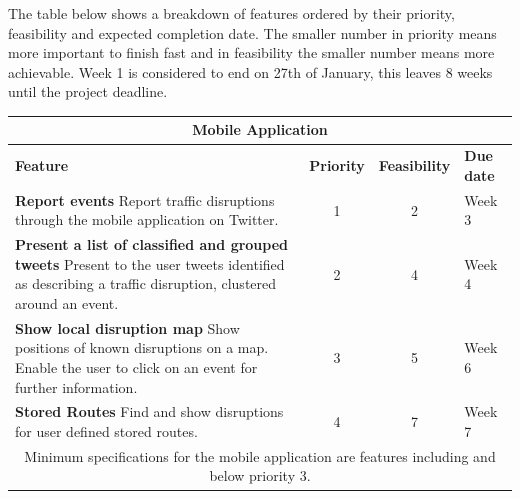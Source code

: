 The table below shows a breakdown of features ordered by their priority, feasibility and expected completion date. The smaller number in priority means more important to finish fast and in feasibility the smaller number means more achievable. Week 1 is considered to end on 27th of January, this leaves 8 weeks until the project deadline.

\begin{center}
\begin{tabular}{ | p{9cm} | c | c | p{1.8cm} | }
\hline
\multicolumn{4}{|c|}{\textbf{Mobile Application}} \\ \hline
\textbf{Feature} & \textbf{Priority} & \textbf{Feasibility} & \textbf{Due date} \\ \hline
\textbf{Report events}\newline
Report traffic disruptions through the mobile application on Twitter. & 1 & 2 & Week 3 \\ \hline
\textbf{Present a list of classified and grouped tweets}\newline
Present to the user tweets identified as describing a traffic disruption,
clustered around an event. & 2 & 4 & Week 4 \\ \hline
\textbf{Show local disruption map}\newline
Show positions of known disruptions on a map. Enable the user to click on an event for further information. & 3 & 5 & Week 6 \\ \hline
\textbf{Stored Routes}\newline
Find and show disruptions for user defined stored routes. & 4 & 7 & Week 7 \\ \hline
\multicolumn{4}{|c|}{Minimum specifications for the mobile application are
features including and below priority 3.} \\ \hline
\end{tabular}
\end{center}
